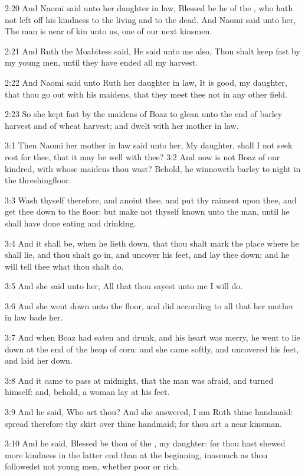 2:20 And Naomi said unto her daughter in law, Blessed be he of the \LORD, who hath not left off his kindness to the living and to the dead. And Naomi said unto her, The man is near of kin unto us, one of our next kinsmen.

2:21 And Ruth the Moabitess said, He said unto me also, Thou shalt keep fast by my young men, until they have ended all my harvest.

2:22 And Naomi said unto Ruth her daughter in law, It is good, my daughter, that thou go out with his maidens, that they meet thee not in any other field.

2:23 So she kept fast by the maidens of Boaz to glean unto the end of barley harvest and of wheat harvest; and dwelt with her mother in law.

3:1 Then Naomi her mother in law said unto her, My daughter, shall I not seek rest for thee, that it may be well with thee?  3:2 And now is not Boaz of our kindred, with whose maidens thou wast?  Behold, he winnoweth barley to night in the threshingfloor.

3:3 Wash thyself therefore, and anoint thee, and put thy raiment upon thee, and get thee down to the floor: but make not thyself known unto the man, until he shall have done eating and drinking.

3:4 And it shall be, when he lieth down, that thou shalt mark the place where he shall lie, and thou shalt go in, and uncover his feet, and lay thee down; and he will tell thee what thou shalt do.

3:5 And she said unto her, All that thou sayest unto me I will do.

3:6 And she went down unto the floor, and did according to all that her mother in law bade her.

3:7 And when Boaz had eaten and drunk, and his heart was merry, he went to lie down at the end of the heap of corn: and she came softly, and uncovered his feet, and laid her down.

3:8 And it came to pass at midnight, that the man was afraid, and turned himself: and, behold, a woman lay at his feet.

3:9 And he said, Who art thou? And she answered, I am Ruth thine handmaid: spread therefore thy skirt over thine handmaid; for thou art a near kinsman.

3:10 And he said, Blessed be thou of the \LORD, my daughter: for thou hast shewed more kindness in the latter end than at the beginning, inasmuch as thou followedst not young men, whether poor or rich.

